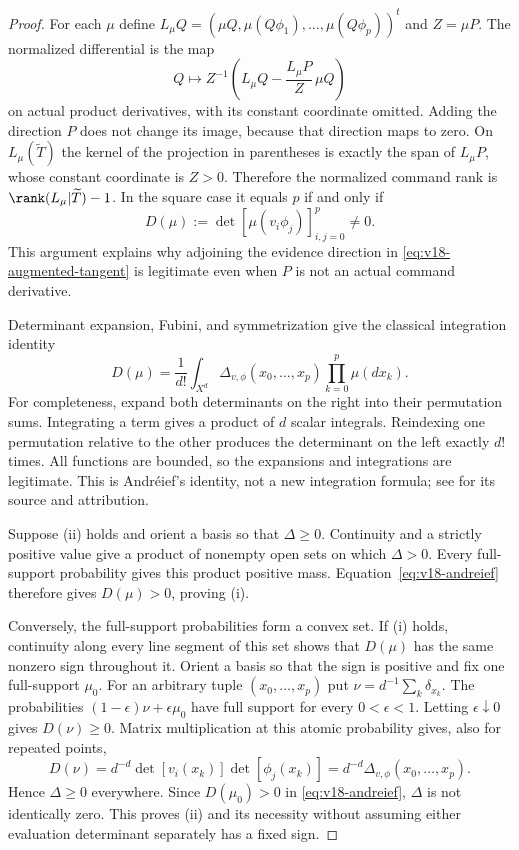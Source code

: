 \documentclass[11pt]{amsart}
\theoremstyle{definition}\newtheorem{definition}[theorem]{Definition}
\theoremstyle{remark}\newtheorem{remark}[theorem]{Remark}
\begin{document}
\begin{proof}
For each $\mu$ define $L_\mu Q=(\mu Q,\mu(Q\phi_1),\ldots,
\mu(Q\phi_p))^t$ and $Z=\mu P$. The normalized differential is the
map
\[
 Q\longmapsto Z^{-1}\left(L_\mu Q-
              \frac{L_\mu P}{Z}\,\mu Q\right)
\]
on actual product derivatives, with its constant coordinate omitted.
Adding the direction $P$ does not change its image, because that
direction maps to zero. On $L_\mu(\widetilde T)$ the kernel of the
projection in parentheses is exactly the span of $L_\mu P$, whose
constant coordinate is $Z>0$. Therefore the normalized command rank
is $\rank(L_\mu|\widetilde T)-1$. In the square case it equals $p$
if and only if
\[
 D(\mu):=\det[\mu(v_i\phi_j)]_{i,j=0}^p\ne0.
\]
This argument explains why adjoining the evidence direction in
\eqref{eq:v18-augmented-tangent} is legitimate even when $P$ is not an
actual command derivative.

Determinant expansion, Fubini, and symmetrization give the classical
integration identity
\begin{equation}\label{eq:v18-andreief}
 D(\mu)=\frac1{d!}\int_{X^d}\Delta_{v,\phi}(x_0,\ldots,x_p)
                     \prod_{k=0}^p\mu(dx_k).
\end{equation}
For completeness, expand both determinants on the right into their
permutation sums. Integrating a term gives a product of $d$ scalar
integrals. Reindexing one permutation relative to the other produces
the determinant on the left exactly $d!$ times. All functions are
bounded, so the expansions and integrations are legitimate. This is
Andr\'eief's identity, not a new integration formula; see
\cite{ForresterAndreief} for its source and attribution.

Suppose \textup{(ii)} holds and orient a basis so that $\Delta\ge0$.
Continuity and a strictly positive value give a product of nonempty
open sets on which $\Delta>0$. Every full-support probability gives
this product positive mass. Equation~\eqref{eq:v18-andreief} therefore
gives $D(\mu)>0$, proving \textup{(i)}.

Conversely, the full-support probabilities form a convex set. If
\textup{(i)} holds, continuity along every line segment of this set
shows that $D(\mu)$ has the same nonzero sign throughout it. Orient a
basis so that the sign is positive and fix one full-support $\mu_0$.
For an arbitrary tuple $(x_0,\ldots,x_p)$ put
$\nu=d^{-1}\sum_k\delta_{x_k}$. The probabilities
$(1-\epsilon)\nu+\epsilon\mu_0$ have full support for every
$0<\epsilon<1$. Letting $\epsilon\downarrow0$ gives $D(\nu)\ge0$.
Matrix multiplication at this atomic probability gives, also for
repeated points,
\[
 D(\nu)=d^{-d}\det[v_i(x_k)]\det[\phi_j(x_k)]
       =d^{-d}\Delta_{v,\phi}(x_0,\ldots,x_p).
\]
Hence $\Delta\ge0$ everywhere. Since $D(\mu_0)>0$ in
\eqref{eq:v18-andreief}, $\Delta$ is not identically zero. This proves
\textup{(ii)} and its necessity without assuming either evaluation
determinant separately has a fixed sign.


\end{proof}
\end{document}
